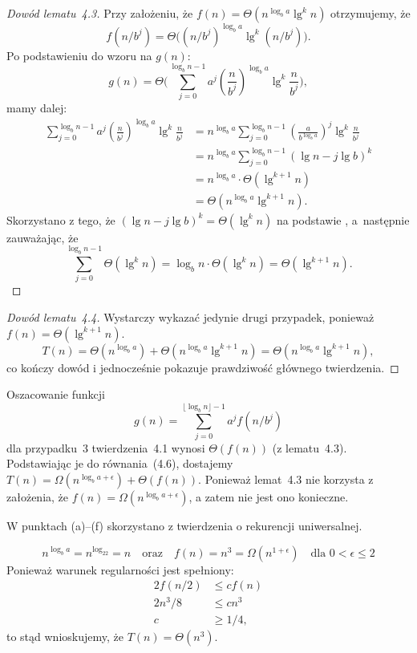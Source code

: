 \begin{proof}[Dowód lematu~4.3]
	Przy założeniu, że $f(n)=\Theta(n^{\log_ba}\lg^kn)$ otrzymujemy, że
	\[
		f(n/b^j)=\Theta\bigl((n/b^j)^{\log_ba}\lg^k(n/b^j)\bigr).
	\]
	Po podstawieniu do wzoru na $g(n)$:
	\[
		g(n) = \Theta\biggl(\sum_{j=0}^{\log_bn-1}a^j\left(\frac{n}{b^j}\right)^{\log_ba}\lg^k\frac{n}{b^j}\biggr),
	\]
	mamy dalej:
	\begin{align*}
		\sum_{j=0}^{\log_bn-1}a^j\left(\frac{n}{b^j}\right)^{\log_ba}\lg^k\frac{n}{b^j} &= n^{\log_ba}\sum_{j=0}^{\log_bn-1}\left(\frac{a}{b^{\log_ba}}\right)^j\lg^k\frac{n}{b^j} \\
		&= n^{\log_ba}\sum_{j=0}^{\log_bn-1}(\lg n-j\lg b)^k \\
		&= n^{\log_ba}\cdot\Theta(\lg^{k+1}n) \\
		&= \Theta(n^{\log_ba}\lg^{k+1}n).
	\end{align*}
	Skorzystano z tego, że $(\lg n-j\lg b)^k=\Theta(\lg^kn)$ na podstawie , a~następnie zauważając, że
	\[
		\sum_{j=0}^{\log_bn-1}\Theta(\lg^kn) = \log_bn\cdot\Theta(\lg^kn) = \Theta(\lg^{k+1}n).
	\]
\end{proof}

\begin{proof}[Dowód lematu~4.4]
	Wystarczy wykazać jedynie drugi przypadek, ponieważ $f(n)=\Theta(\lg^{k+1}n)$.
	\[
		T(n) = \Theta(n^{\log_ba})+\Theta(n^{\log_ba}\lg^{k+1}n) = \Theta(n^{\log_ba}\lg^{k+1}n),
	\]
	co kończy dowód i jednocześnie pokazuje prawdziwość głównego twierdzenia.
\end{proof}

\exercise{} %
\noindent Oszacowanie funkcji
\[
	g(n) = \sum_{j=0}^{\lfloor\log_bn\rfloor-1}a^jf(n/b^j)
\]
dla przypadku~3 twierdzenia~4.1 wynosi $\Theta(f(n))$ (z lematu~4.3). Podstawiając je do równania~(4.6), dostajemy $T(n)=\Omega(n^{\log_ba+\epsilon})+\Theta(f(n))$. 
Ponieważ lemat~4.3 nie korzysta z założenia, że $f(n)=\Omega(n^{\log_ba+\epsilon})$, a zatem nie jest ono konieczne.

\problems

\noindent W punktach (a)\nobreakdash--(f) skorzystano z twierdzenia o rekurencji uniwersalnej.

\subexercise{} %
\[
	n^{\log_ba} = n^{\log_22} = n \quad\text{oraz}\quad f(n) = n^3 = \Omega(n^{1+\epsilon}) \quad\text{dla $0<\epsilon\le2$}
\]
Ponieważ warunek regularności jest spełniony:
\begin{align*}
	2f(n/2) &\le cf(n) \\
	2n^3\!/8 &\le cn^3 \\
	c &\ge 1/4,
\end{align*}
to stąd wnioskujemy, że $T(n)=\Theta(n^3)$.

